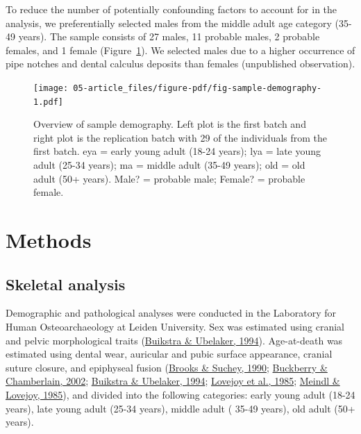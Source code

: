 \documentclass[
  letterpaper,
]{book}
\begin{document}
To reduce the number of potentially confounding factors to account for
in the analysis, we preferentially selected males from the middle adult
age category (35-49 years). The sample consists of 27 males, 11 probable
males, 2 probable females, and 1 female
(Figure~\ref{fig-sample-demography}). We selected males due to a higher
occurrence of pipe notches and dental calculus deposits than females
(unpublished observation).

\begin{figure}

{\centering \texttt{[image: 05-article\_files/figure-pdf/fig-sample-demography-1.pdf]}

}

\caption{\label{fig-sample-demography}Overview of sample demography.
Left plot is the first batch and right plot is the replication batch
with 29 of the individuals from the first batch. eya = early young adult
(18-24 years); lya = late young adult (25-34 years); ma = middle adult
(35-49 years); old = old adult (50+ years). Male? = probable male;
Female? = probable female.}

\end{figure}

\hypertarget{methods}{%
\section{Methods}\label{methods}}

\hypertarget{skeletal-analysis}{%
\subsection{Skeletal analysis}\label{skeletal-analysis}}

Demographic and pathological analyses were conducted in the Laboratory
for Human Osteoarchaeology at Leiden University. Sex was estimated using
cranial and pelvic morphological traits
(\protect\hyperlink{ref-Standards1994}{Buikstra \& Ubelaker, 1994}).
Age-at-death was estimated using dental wear, auricular and pubic
surface appearance, cranial suture closure, and epiphyseal fusion
(\protect\hyperlink{ref-SucheyBrooks1990}{Brooks \& Suchey, 1990};
\protect\hyperlink{ref-buckberryAuricular2002}{Buckberry \& Chamberlain,
2002}; \protect\hyperlink{ref-Standards1994}{Buikstra \& Ubelaker,
1994}; \protect\hyperlink{ref-lovejoyAuricular1985}{Lovejoy et al.,
1985}; \protect\hyperlink{ref-meindlSutureClosure1985}{Meindl \&
Lovejoy, 1985}), and divided into the following categories: early young
adult (18-24 years), late young adult (25-34 years), middle adult (
35-49 years), old adult (50+ years).
\end{document}
